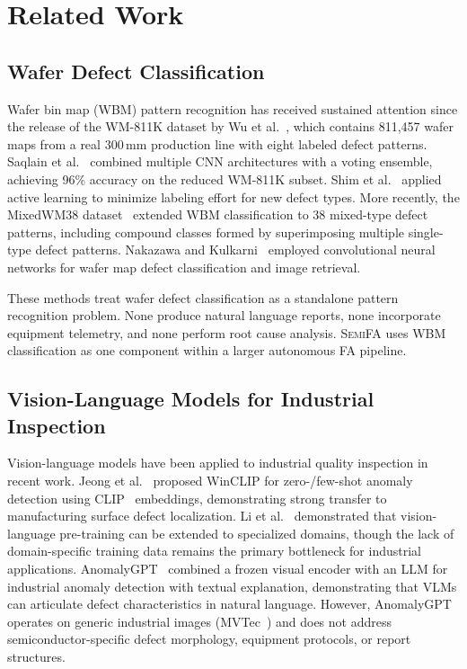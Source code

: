 \documentclass[conference]{IEEEtran}
\newcommand{\semifa}{\textsc{SemiFA}}
\begin{document}
\section{Related Work}
\label{sec:related}

\subsection{Wafer Defect Classification}

Wafer bin map (WBM) pattern recognition has received sustained attention since the release of the WM-811K dataset by Wu et al.~\cite{wu2015wafer}, which contains 811,457 wafer maps from a real 300\,mm production line with eight labeled defect patterns.
Saqlain et al.~\cite{saqlain2020voting} combined multiple CNN architectures with a voting ensemble, achieving 96\% accuracy on the reduced WM-811K subset.
Shim et al.~\cite{shim2020active} applied active learning to minimize labeling effort for new defect types.
More recently, the MixedWM38 dataset~\cite{wang2020mixedwm38} extended WBM classification to 38 mixed-type defect patterns, including compound classes formed by superimposing multiple single-type defect patterns.
Nakazawa and Kulkarni~\cite{nakazawa2018anomaly} employed convolutional neural networks for wafer map defect classification and image retrieval.

These methods treat wafer defect classification as a standalone pattern recognition problem.
None produce natural language reports, none incorporate equipment telemetry, and none perform root cause analysis.
\semifa{} uses WBM classification as one component within a larger autonomous FA pipeline.

\subsection{Vision-Language Models for Industrial Inspection}

Vision-language models have been applied to industrial quality inspection in recent work.
Jeong et al.~\cite{jeong2023winclip} proposed WinCLIP for zero-/few-shot anomaly detection using CLIP~\cite{radford2021clip} embeddings, demonstrating strong transfer to manufacturing surface defect localization.
Li et al.~\cite{li2024mllm} demonstrated that vision-language pre-training can be extended to specialized domains, though the lack of domain-specific training data remains the primary bottleneck for industrial applications.
AnomalyGPT~\cite{gu2024anomalygpt} combined a frozen visual encoder with an LLM for industrial anomaly detection with textual explanation, demonstrating that VLMs can articulate defect characteristics in natural language.
However, AnomalyGPT operates on generic industrial images (MVTec~\cite{bergmann2019mvtec}) and does not address semiconductor-specific defect morphology, equipment protocols, or report structures.
\end{document}
